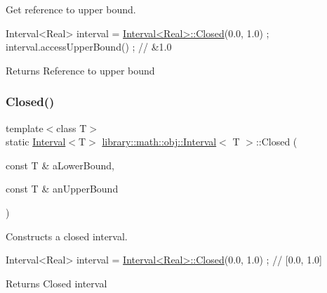Get reference to upper bound. 


\begin{DoxyCode}
Interval<Real> interval = \hyperlink{classlibrary_1_1math_1_1obj_1_1_interval_aae8bb2b89af450729338d48563def4d7}{Interval<Real>::Closed}(0.0, 1.0) ;
interval.accessUpperBound() ; \textcolor{comment}{// &1.0}
\end{DoxyCode}


\begin{DoxyReturn}{Returns}
Reference to upper bound 
\end{DoxyReturn}
\mbox{\label{classlibrary_1_1math_1_1obj_1_1_interval_aae8bb2b89af450729338d48563def4d7}} 
\subsubsection{\texorpdfstring{Closed()}{Closed()}}
{\footnotesize\ttfamily template$<$class T$>$ \\
static \hyperlink{classlibrary_1_1math_1_1obj_1_1_interval}{Interval}$<$T$>$ \hyperlink{classlibrary_1_1math_1_1obj_1_1_interval}{library\+::math\+::obj\+::\+Interval}$<$ T $>$\+::Closed (\begin{DoxyParamCaption}\item[{const T \&}]{a\+Lower\+Bound,  }\item[{const T \&}]{an\+Upper\+Bound }\end{DoxyParamCaption})\hspace{0.3cm}{\ttfamily [static]}}



Constructs a closed interval. 


\begin{DoxyCode}
Interval<Real> interval = \hyperlink{classlibrary_1_1math_1_1obj_1_1_interval_aae8bb2b89af450729338d48563def4d7}{Interval<Real>::Closed}(0.0, 1.0) ; \textcolor{comment}{// [0.0, 1.0]}
\end{DoxyCode}


\begin{DoxyReturn}{Returns}
Closed interval 
\end{DoxyReturn}
\mbox{\label{classlibrary_1_1math_1_1obj_1_1_interval_af100f4b53dc3211efde2733c19e458c3}} 
